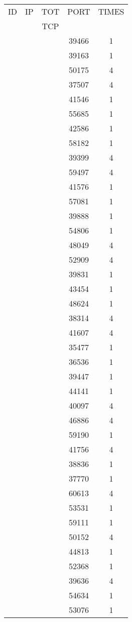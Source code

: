 \documentclass[a4paper]{scrartcl}
\begin{document}
\begin{minipage}[b]{0.5\linewidth}
\begin{tabular}{| c | c | c | c | c |}
\hline
ID & IP & TOT & PORT & TIMES \\ 
   &    & TCP &      &       \\ 
\hline
& & & 39466 & 1 \\ & & & 39163 & 1 \\ & & & 50175 & 4 \\ & & & 37507 & 4 \\ & & & 41546 & 1 \\ & & & 55685 & 1 \\ & & & 42586 & 1 \\ & & & 58182 & 1 \\ & & & 39399 & 4 \\ & & & 59497 & 4 \\ & & & 41576 & 1 \\ & & & 57081 & 1 \\ & & & 39888 & 1 \\ & & & 54806 & 1 \\ & & & 48049 & 4 \\ & & & 52909 & 4 \\ & & & 39831 & 1 \\ & & & 43454 & 1 \\ & & & 48624 & 1 \\ & & & 38314 & 4 \\ & & & 41607 & 4 \\ & & & 35477 & 1 \\ & & & 36536 & 1 \\ & & & 39447 & 1 \\ & & & 44141 & 1 \\ & & & 40097 & 4 \\ & & & 46886 & 4 \\ & & & 59190 & 1 \\ & & & 41756 & 4 \\ & & & 38836 & 1 \\ & & & 37770 & 1 \\ & & & 60613 & 4 \\ & & & 53531 & 1 \\ & & & 59111 & 1 \\ & & & 50152 & 4 \\ & & & 44813 & 1 \\ & & & 52368 & 1 \\ & & & 39636 & 4 \\ & & & 54634 & 1 \\ & & & 53076 & 1 \\ \hline\end{tabular}\end{minipage} \hfill\begin{minipage}[b]{0.5\linewidth}\begin{tabular}{| c | c | c | c | c |}

\end{tabular}
\end{minipage}
\end{document}
